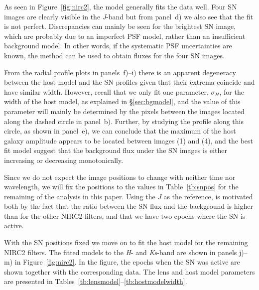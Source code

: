 \documentclass[a4paper,fleqn,usenatbib]{mnras}
\newcommand{\sn}{SN\xspace}
\newcommand{\jband}{{\it J}\xspace}
\newcommand{\hband}{{\it H}\xspace}
\newcommand{\ksband}{{\it Ks}\xspace}
\begin{document}
\begin{table}
	\centering
	\caption{%
		The fitted widths, $\sigma_H$, for the host model defined in eq.~\eqref{eq:host}.
	\label{tb:hostmodelwidth}}
		
\end{table}

As seen in Figure~\ref{fig:nirc2}, the model generally fits the data well.  Four \sn images are clearly visible in the \jband-band 
but from panel~d) we also see that the fit is not perfect.  Discrepancies can mainly be seen for the brightest \sn image, which are 
probably due to an imperfect PSF model, rather than an insufficient background model.  In other words, if the systematic PSF
uncertainties are known, the method can be used to obtain fluxes for the four \sn images.

From the radial profile plots in panels~f)--i) there is an apparent degeneracy between the host model and the \sn profiles given 
that their extrema coincide and have similar width.  However, recall that we only fit one parameter, $\sigma_H$, for the width of 
the host model, as explained in \S\ref{sec:bgmodel}, and the value of this parameter will mainly be determined by the pixels 
between the images located along the dashed circle in panel~b).  Further, by studying the profile along this circle, as shown in 
panel~e), we can conclude that the maximum of the host galaxy amplitude appears to be located between images (1) and (4),  
and the best fit model suggest that the background flux under the \sn images is either increasing or decreasing monotonically.

Since we do not expect the image positions to change with neither time nor wavelength, we will fix the positions to the 
values in Table~\ref{tb:snpos} for the remaining of the analysis in this paper.  Using the \jband as the reference, is motivated 
both by the fact that the ratio between the \sn flux and the background is higher than for the other NIRC2 filters, and that we 
have two epochs where the \sn is active.

With the \sn positions fixed we move on to fit the host model for the remaining NIRC2 filters.  The fitted models to the 
\hband- and \ksband-band are shown in panels j)--m) in Figure~\ref{fig:nirc2}.  In the figure, the epochs when the \sn was 
active are shown together with the corresponding data.  The lens and host model parameters are presented in 
Tables~\ref{tb:lensmodel}--\ref{tb:hostmodelwidth}.  
\end{document}
